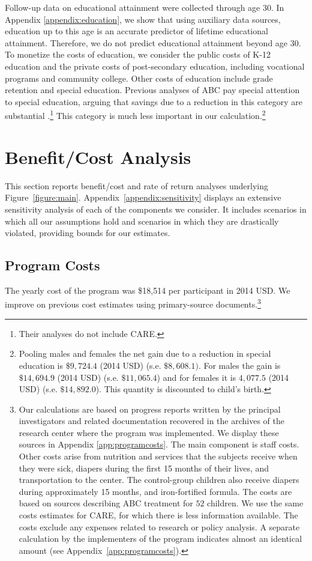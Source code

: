 Follow-up data on educational attainment were collected through age 30. In Appendix \ref{appendix:education}, we show that using auxiliary data sources, education up to this age is an accurate predictor of lifetime educational attainment. Therefore, we do not predict educational attainment beyond age 30. To monetize the costs of education, we consider the public costs of K-12 education and the private costs of post-secondary education, including vocational programs and community college. Other costs of education include grade retention and special education. Previous analyses of ABC pay special attention to special education, arguing that savings due to a reduction in this category are substantial \citep{Barnett_Masse_2002_benefitcost,Barnett_Masse_2007_EER}.\footnote{Their analyses do not include CARE.} This category is much less important in our calculation.\footnote{Pooling males and females the net gain due to a reduction in special education is $\$9,724.4$ (2014 USD) (s.e. $\$8,608.1)$. For males the gain is $\$14,694.9$ (2014 USD) (s.e. $\$11,065.4$) and for females it is $4,077.5$ (2014 USD) (s.e. $\$14,892.0$). This quantity is discounted to child's birth.}

\section{Benefit/Cost Analysis} \label{section:cbaresults}

This section reports benefit/cost and rate of return analyses underlying Figure~\ref{figure:main}. Appendix~\ref{appendix:sensitivity} displays an extensive sensitivity analysis of each of the components we consider. It includes scenarios in which all our assumptions hold and scenarios in which they are drastically violated, providing bounds for our estimates.

\subsection{Program Costs} \label{section:programscosts}

The yearly cost of the program was \$18,514 per participant in 2014 USD. We improve on previous cost estimates using primary-source documents.\footnote{Our calculations are based on progress reports written by the principal investigators and related documentation recovered in the archives of the research center where the program was implemented. We display these sources in Appendix \ref{app:programcosts}. The main component is staff costs. Other costs arise from nutrition and services that the subjects receive when they were sick, diapers during the first 15 months of their lives, and transportation to the center. The control-group children also receive diapers during approximately 15 months, and iron-fortified formula. The costs are based on sources describing ABC treatment for $52$ children. We use the same costs estimates for CARE, for which there is less information available. The costs exclude any expenses related to research or policy analysis. A separate calculation by the implementers of the program indicates almost an identical amount (see Appendix~\ref{app:programcosts}).}


